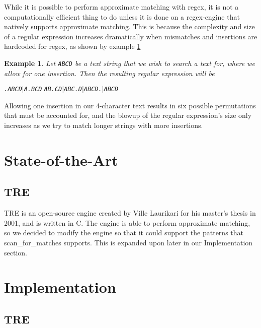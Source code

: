 \documentclass[11pt,twoside,a4paper]{article}
\newtheorem{example}{Example}
\begin{document}
   While it is possible to perform approximate matching with regex, it is not 
   a computationally efficient thing to do unless it is done on a regex-engine 
   that natively supports approximate matching. This is because the complexity 
   and size of a regular expression increases dramatically when mismatches and 
   insertions are hardcoded for regex, as shown by example \ref{exInsert}
   \begin{example}\label{exInsert}
   Let {\tt ABCD} be a text string that we wish to search a text for, where we 
   allow for one insertion. Then the resulting regular expression will be \\
   \begin{center}
   {\tt .ABCD$|$A.BCD$|$AB.CD$|$ABC.D$|$ABCD.$|$ABCD}
   \end{center}
   \end{example}
   Allowing one insertion in our 4-character text results in six possible 
   permutations that must be accounted for, and the blowup of the regular 
   expression's size only increases as we try to match longer strings with more 
   insertions.
\section{State-of-the-Art}
 \subsection{TRE}
  TRE is an open-source engine created by Ville Laurikari for his 
  master's thesis in 2001, and is written in C. The engine is able to perform 
  approximate matching, so we decided to modify the engine so that it could 
  support the patterns that scan\_for\_matches supports. This is expanded 
  upon later in our Implementation section.
  
  
\section{Implementation}
 \subsection{TRE}
  
  
  
\end{document}
